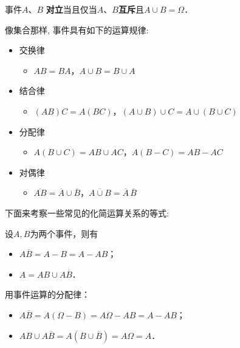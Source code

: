 \begin{proposition}
    事件$A$、$B$ \textbf{对立}当且仅当$A$、$B$\textbf{互斥}且$A\cup B=\Omega$．
\end{proposition}

像集合那样, 事件具有如下的运算规律: 
\begin{itemize}
    \item 交换律
          \begin{itemize}
              \item $AB=BA$，$A\cup B=B\cup A$
          \end{itemize}
    \item 结合律
          \begin{itemize}
              \item $(AB)C=A(BC)$，$(A\cup B)\cup C=A\cup(B\cup C)$
          \end{itemize}
    \item 分配律
          \begin{itemize}
              \item $A(B\cup C)=AB\cup AC$，$A(B-C)=AB-AC$
          \end{itemize}
    \item 对偶律
          \begin{itemize}
              \item $\overline{AB}=\overline{A}\cup\overline{B}$，$\overline{A\cup B}=\overline{A}\,\overline{B}$
          \end{itemize}
\end{itemize}

下面来考察一些常见的化简运算关系的等式: 
\begin{example}
    设$A,B$为两个事件，则有
        \begin{itemize}
            \item $A\overline{B}=A-B=A-AB$；
            \item $A=AB\cup A\overline{B}$．
        \end{itemize}
\end{example}

\begin{solution}
    用事件运算的分配律：
    \begin{itemize}
        \item $A\overline{B}=A(\Omega-B)=A\Omega-AB=A-AB$；
        \item $AB\cup A\overline{B}=A(B\cup\overline{B})=A\Omega=A$．
    \end{itemize}
\end{solution}

